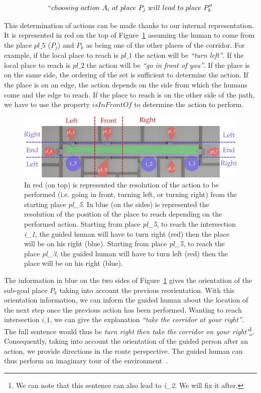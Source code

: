 \begin{gather*}
``choosing\ action\ A_i\ at\ place\ P_j\ will\ lead\ to\ place\ P_k''
\end{gather*}

This determination of actions can be made thanks to our internal representation. It is represented in red on the top of Figure~\ref{fig:chap3_directions} assuming the human to come from the place $pl\_5$ ($P_j$) and $P_k$ as being one of the other places of the corridor. For example, if the local place to reach is $pl\_1$ the action will be \textit{``turn left''}. If the local place to reach is $pl\_2$ the action will be \textit{``go in front of you''}. If the place is on the same side, the ordering of the set is sufficient to determine the action. If the place is on an edge, the action depends on the side from which the humans come and the edge to reach. If the place to reach is on the other side of the path, we have to use the property $isInFrontOf$ to determine the action to perform.

\begin{figure}[ht!]
\centering
\includegraphics[width=\textwidth]{figures/chapter3/directions.png}
\caption{\label{fig:chap3_directions} In red (on top) is represented the resolution of the action to be performed (i.e. going in front, turning left, or turning right) from the starting place \textit{pl\_5}. In blue (on the sides) is represented the resolution of the position of the place to reach depending on the performed action. Starting from place \textit{pl\_5}, to reach the intersection \textit{i\_1}, the guided human will have to turn right (red) then the place will be on his right (blue). Starting from place \textit{pl\_5}, to reach the place \textit{pl\_3}, the guided human will have to turn left (red) then the place will be on his right (blue). }
\end{figure}

The information in blue on the two sides of Figure~\ref{fig:chap3_directions} gives the orientation of the sub-goal place $P_{k}$ taking into account the previous reorientation. With this orientation information, we can inform the guided human about the location of the next step once the previous action has been performed. Wanting to reach intersection $i\_1$, we can give the explanation \textit{``take the corridor at your right''}. The full sentence would thus be \textit{turn right then take the corridor on your right"}\footnote{We can note that this sentence can also lead to \textit{i\_2}. We will fix it after.}. Consequently, taking into account the orientation of the guided person after an action, we provide directions in the route perspective. The guided human can thus perform an imaginary tour of the environment~\cite{cassell_2007_trading}.

